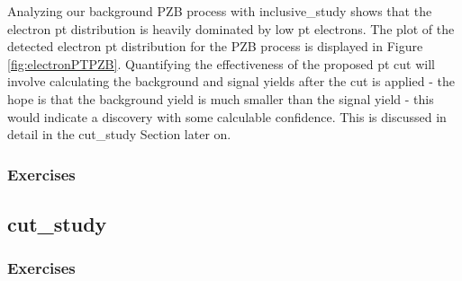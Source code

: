 \documentclass{article}
\begin{document}
\bigskip

Analyzing our background PZB process with inclusive\_study shows that the electron pt distribution is heavily dominated by low pt electrons. The plot
of the detected electron pt distribution for the PZB process is displayed in Figure \ref{fig:electronPTPZB}. Quantifying the effectiveness of the proposed pt cut will
involve calculating the background and signal yields after the cut is applied - the hope is that the background yield is much smaller than the signal
yield - this would indicate a discovery with some calculable confidence. This is discussed in detail in the cut\_study Section later on.

\subsubsection*{Exercises}

\subsection{cut\_study}

\subsubsection*{Exercises}
\end{document}
